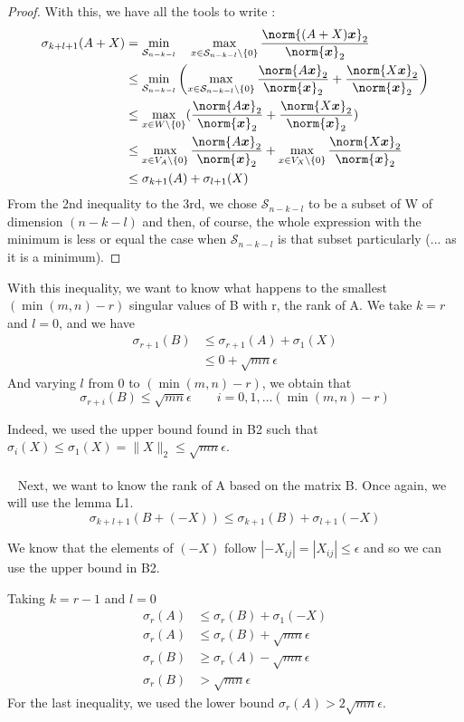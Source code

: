 \documentclass[11pt]{article}
\newcommand{\snorm}[1]{\norm{#1}_2} %
\begin{document}
\begin{proof}
With this, we have all the tools to write :
\begin{align*}
\sigma_{k+l + 1}(A+X) &= \min_{\mathcal{S}_{n-k-l}} \quad \max_{x \in \mathcal{S}_{n-k-l} \setminus \{0\}} \frac{\snorm{(A+X)\bm{x}}}{\snorm{\bm{x}}}\\
&\leq \min_{\mathcal{S}_{n-k-l}} \left( \max_{x \in \mathcal{S}_{n-k-l} \setminus \{0\}} \frac{\snorm{A\bm{x}}}{\snorm{\bm{x}}} + \frac{\snorm{X\bm{x}}}{\snorm{\bm{x}}} \right)\\
&\leq \max_{x \in W \setminus \{0\}}( \frac{\snorm{A\bm{x}}}{\snorm{\bm{x}}} + \frac{\snorm{X\bm{x}}}{\snorm{\bm{x}}})\\
&\leq \max_{x \in V_A \setminus \{0\}} \frac{\snorm{A\bm{x}}}{\snorm{\bm{x}}} + \max_{x \in V_X \setminus \{0\}} \frac{\snorm{X\bm{x}}}{\snorm{\bm{x}}}\\
&\leq \sigma_{k+1}(A) + \sigma_{l+1}(X)
\end{align*}
From the 2nd inequality to the 3rd, we chose $\mathcal{S}_{n-k-l}$ to be a subset of W of dimension $(n-k-l)$ and then, of course, the whole expression with the minimum is less or equal the case when $\mathcal{S}_{n-k-l}$ is that subset particularly (... as it is a minimum).
\end{proof}

With this inequality, we want to know what happens to the smallest $(\min(m,n)-r)$ singular values of B with r, the rank of A.
We take $k=r$ and $l=0$, and we have 
\begin{align}
\sigma_{r+1}(B) &\leq \sigma_{r+1}(A) + \sigma_{1}(X)\\
&\leq 0 + \sqrt{mn}\epsilon
\end{align}
And varying $l$ from $0$ to $(\min(m,n)-r)$, we obtain that 
\[\sigma_{r+i}(B) \leq \sqrt{mn}\epsilon \qquad i = 0,1, \dots (\min(m,n)-r)
\]

Indeed, we used the upper bound found in B2 such that $\sigma_i(X)\leq \sigma_1(X)= \|X\|_2\leq \sqrt{mn}\epsilon$.
\\~
\\~
Next, we want to know the rank of A based on the matrix B. Once again, we will use the lemma L1.
\[
\sigma_{k+l + 1}(B+(-X))
\leq \sigma_{k+1}(B) + \sigma_{l+1}(-X)
\]

We know that the elements of $(-X)$ follow $ |-X_{ij}| = |X_{ij}| \leq \epsilon$ and so we can use the upper bound in B2.

Taking $k = r-1$ and $l = 0$
\begin{align*}
\sigma_r(A) &\leq \sigma_{r}(B) + \sigma_{1}(-X)\\
 \sigma_r(A)&\leq \sigma_{r}(B) + \sqrt{mn}\epsilon\\
 \sigma_r(B) &\geq \sigma_r(A) - \sqrt{mn}\epsilon\\
 \sigma_r(B)&> \sqrt{mn}\epsilon
\end{align*}
For the last inequality, we used the lower bound $\sigma_r(A) > 2\sqrt{mn}\epsilon$.
\end{document}
